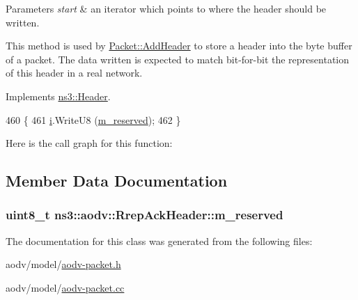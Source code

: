\begin{DoxyParams}{Parameters}
{\em start} & an iterator which points to where the header should be written.\\
\hline
\end{DoxyParams}
This method is used by \hyperlink{classns3_1_1Packet_a465108c595a0bc592095cbcab1832ed8}{Packet\+::\+Add\+Header} to store a header into the byte buffer of a packet. The data written is expected to match bit-\/for-\/bit the representation of this header in a real network. 

Implements \hyperlink{classns3_1_1Header_afb61f1aac69ff8349a6bfe521fab5404}{ns3\+::\+Header}.


\begin{DoxyCode}
460 \{
461   \hyperlink{bernuolliDistribution_8m_a6f6ccfcf58b31cb6412107d9d5281426}{i}.WriteU8 (\hyperlink{classns3_1_1aodv_1_1RrepAckHeader_af1b08f3d81448268bb522a4acd440a04}{m\_reserved});
462 \}
\end{DoxyCode}


Here is the call graph for this function\+:




\subsection{Member Data Documentation}
\subsubsection[{\texorpdfstring{m\+\_\+reserved}{m_reserved}}]{\setlength{\rightskip}{0pt plus 5cm}uint8\+\_\+t ns3\+::aodv\+::\+Rrep\+Ack\+Header\+::m\+\_\+reserved\hspace{0.3cm}{\ttfamily [private]}}\hypertarget{classns3_1_1aodv_1_1RrepAckHeader_af1b08f3d81448268bb522a4acd440a04}{}\label{classns3_1_1aodv_1_1RrepAckHeader_af1b08f3d81448268bb522a4acd440a04}


The documentation for this class was generated from the following files\+:\begin{DoxyCompactItemize}
\item 
aodv/model/\hyperlink{aodv-packet_8h}{aodv-\/packet.\+h}\item 
aodv/model/\hyperlink{aodv-packet_8cc}{aodv-\/packet.\+cc}\end{DoxyCompactItemize}
